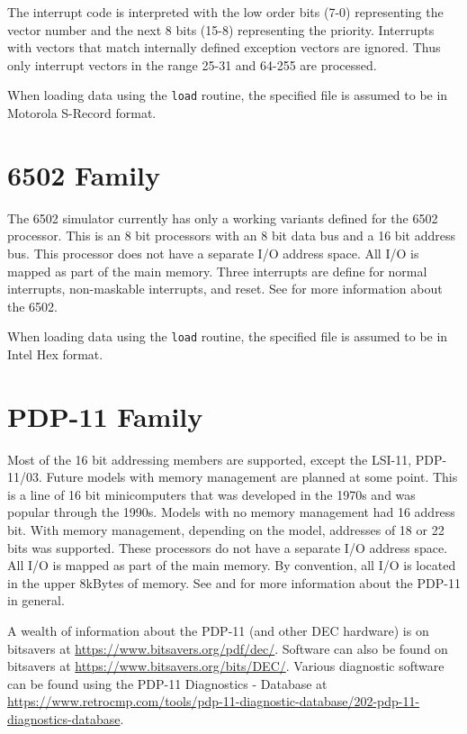 \documentclass[10pt, openany]{book}
\newcommand{\function}[1]{\texttt{#1}}
\begin{document}
The interrupt code is interpreted with the low order bits (7-0) representing the vector number and the next 8 bits (15-8) representing the priority.
Interrupts with vectors that match internally defined exception vectors are ignored.
Thus only interrupt vectors in the range 25-31 and 64-255 are processed.

When loading data using the \function{load} routine, the specified file is assumed to be in Motorola S-Record format.

\section{6502 Family}
The 6502 simulator currently has only a working variants defined for the 6502 processor.
This is an 8 bit processors with an 8 bit data bus and a 16 bit address bus.
This processor does not have a separate I/O address space.
All I/O is mapped as part of the main memory.
Three interrupts are define for normal interrupts, non-maskable interrupts, and reset.
See \cite{msc6502} for more information about the 6502.

When loading data using the \function{load} routine, the specified file is assumed to be in Intel Hex format.

\section{PDP-11 Family}
Most of the 16 bit addressing members are supported, except the LSI-11, PDP-11/03.
Future models with memory management are planned at some point.
This is a line of 16 bit minicomputers that was developed in the 1970s and was popular through the 1990s.
Models with no memory management had 16 address bit.
With memory management, depending on the model, addresses of 18 or 22 bits was supported.
These processors do not have a separate I/O address space.
All I/O is mapped as part of the main memory.
By convention, all I/O is located in the upper 8kBytes of memory.
See \cite{dec80} and \cite{dec84} for more information about the PDP-11 in general.

A wealth of information about the PDP-11 (and other DEC hardware) is on bitsavers at \url{https://www.bitsavers.org/pdf/dec/}.
Software can also be found on bitsavers at \url{https://www.bitsavers.org/bits/DEC/}.
Various diagnostic software can be found using the PDP-11 Diagnostics - Database at \url{https://www.retrocmp.com/tools/pdp-11-diagnostic-database/202-pdp-11-diagnostics-database}.
\end{document}
